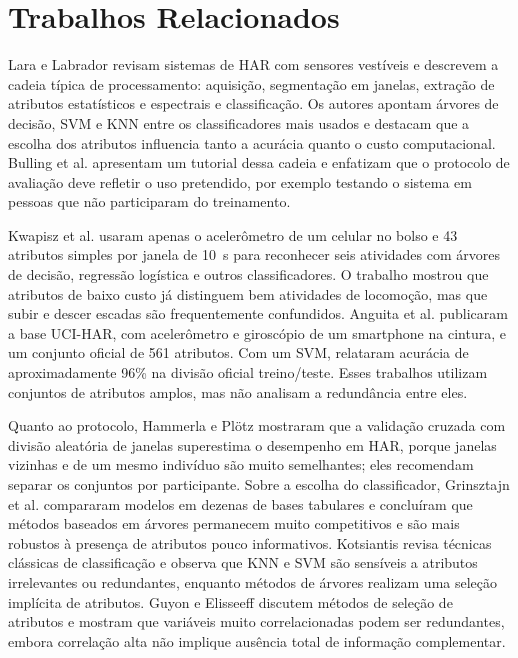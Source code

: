 \documentclass[conference]{IEEEtran}
\begin{document}
\section{Trabalhos Relacionados}
\label{sec:relacionados}
Lara e Labrador \cite{Lara2013} revisam sistemas de HAR com sensores vestíveis e descrevem a cadeia típica de processamento: aquisição, segmentação em janelas, extração de atributos estatísticos e espectrais e classificação. Os autores apontam árvores de decisão, SVM e KNN entre os classificadores mais usados e destacam que a escolha dos atributos influencia tanto a acurácia quanto o custo computacional. Bulling et al. \cite{Bulling2014} apresentam um tutorial dessa cadeia e enfatizam que o protocolo de avaliação deve refletir o uso pretendido, por exemplo testando o sistema em pessoas que não participaram do treinamento.

Kwapisz et al. \cite{Kwapisz2011} usaram apenas o acelerômetro de um celular no bolso e 43 atributos simples por janela de 10~s para reconhecer seis atividades com árvores de decisão, regressão logística e outros classificadores. O trabalho mostrou que atributos de baixo custo já distinguem bem atividades de locomoção, mas que subir e descer escadas são frequentemente confundidos. Anguita et al. \cite{Anguita2013} publicaram a base UCI-HAR, com acelerômetro e giroscópio de um smartphone na cintura, e um conjunto oficial de 561 atributos. Com um SVM, relataram acurácia de aproximadamente 96\% na divisão oficial treino/teste. Esses trabalhos utilizam conjuntos de atributos amplos, mas não analisam a redundância entre eles.

Quanto ao protocolo, Hammerla e Plötz \cite{Hammerla2015} mostraram que a validação cruzada com divisão aleatória de janelas superestima o desempenho em HAR, porque janelas vizinhas e de um mesmo indivíduo são muito semelhantes; eles recomendam separar os conjuntos por participante. Sobre a escolha do classificador, Grinsztajn et al. \cite{Grinsztajn2022} compararam modelos em dezenas de bases tabulares e concluíram que métodos baseados em árvores permanecem muito competitivos e são mais robustos à presença de atributos pouco informativos. Kotsiantis \cite{Kotsiantis2007} revisa técnicas clássicas de classificação e observa que KNN e SVM são sensíveis a atributos irrelevantes ou redundantes, enquanto métodos de árvores realizam uma seleção implícita de atributos. Guyon e Elisseeff \cite{Guyon2003} discutem métodos de seleção de atributos e mostram que variáveis muito correlacionadas podem ser redundantes, embora correlação alta não implique ausência total de informação complementar.
\end{document}
